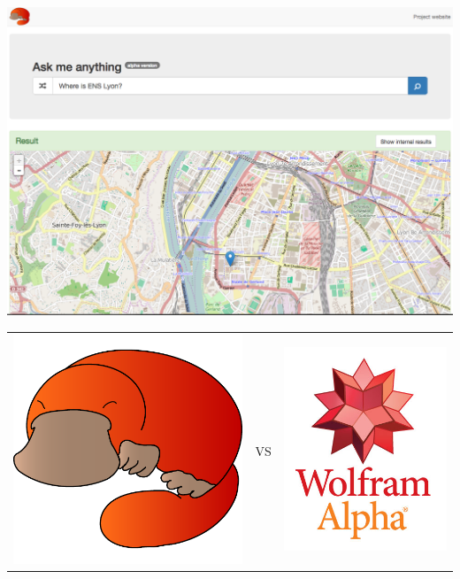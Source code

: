 \begin{frame}[plain]
    \includegraphics[width=\linewidth]{figures/demo-whereIsEnsLyon.png}
\end{frame}

\begin{frame}
    \begin{center}
    \begin{tabular}{ccc}
        \includegraphics[width=0.3\linewidth]{figures/platypus.pdf} &
        \Huge VS &
        \includegraphics[width=0.3\linewidth]{figures/wa-logo-stacked2-large.png}
    \end{tabular}
    \end{center}
\end{frame}


